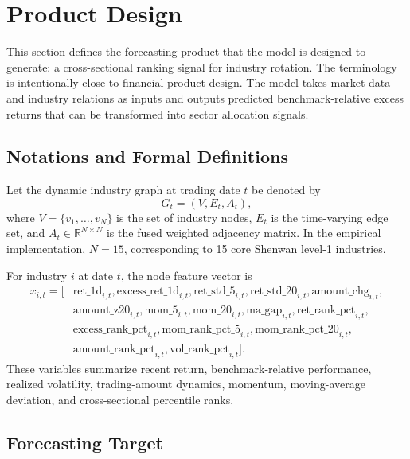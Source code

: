 \documentclass[12pt]{article}
\begin{document}
\section{Product Design}
\label{sec:design}

This section defines the forecasting product that the model is designed to generate: a cross-sectional ranking signal for industry rotation. The terminology is intentionally close to financial product design. The model takes market data and industry relations as inputs and outputs predicted benchmark-relative excess returns that can be transformed into sector allocation signals.

\subsection{Notations and Formal Definitions}

Let the dynamic industry graph at trading date $t$ be denoted by
\begin{equation}
G_t=(V,E_t,A_t),
\end{equation}
where $V=\{v_1,\ldots,v_N\}$ is the set of industry nodes, $E_t$ is the time-varying edge set, and $A_t\in \mathbb{R}^{N\times N}$ is the fused weighted adjacency matrix. In the empirical implementation, $N=15$, corresponding to 15 core Shenwan level-1 industries.

For industry $i$ at date $t$, the node feature vector is
\begin{equation}
\begin{aligned}
x_{i,t}=\big[&
\text{ret\_1d}_{i,t},\text{excess\_ret\_1d}_{i,t},
\text{ret\_std\_5}_{i,t},\text{ret\_std\_20}_{i,t},\text{amount\_chg}_{i,t},\\
&\text{amount\_z20}_{i,t},\text{mom\_5}_{i,t},\text{mom\_20}_{i,t},\text{ma\_gap}_{i,t},
\text{ret\_rank\_pct}_{i,t},\\
&\text{excess\_rank\_pct}_{i,t},\text{mom\_rank\_pct\_5}_{i,t},
\text{mom\_rank\_pct\_20}_{i,t},\\
&\text{amount\_rank\_pct}_{i,t},\text{vol\_rank\_pct}_{i,t}\big].
\end{aligned}
\end{equation}
These variables summarize recent return, benchmark-relative performance, realized volatility, trading-amount dynamics, momentum, moving-average deviation, and cross-sectional percentile ranks.

\subsection{Forecasting Target}
\end{document}

